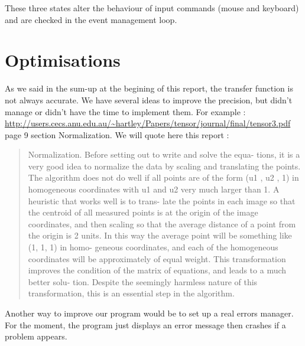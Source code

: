 \documentclass[a4paper,10pt]{report}
\begin{document}
These three states alter the behaviour of input commands (mouse and keyboard) and are checked in the event management loop.


\section{Optimisations}

As we said in the sum-up at the begining of this report, the transfer function is not always accurate.
We have several ideas to improve the precision, but didn't manage or didn't have the time to implement them. For example : \url{http://users.cecs.anu.edu.au/~hartley/Papers/tensor/journal/final/tensor3.pdf} page 9 section Normalization.
We will quote here this report :
\begin{quotation}
  Normalization. Before setting out to write and solve the equa-
  tions, it is a very good idea to normalize the data by scaling and
  translating the points. The algorithm does not do well if all points
  are of the form (u1 , u2 , 1) in homogeneous coordinates with u1 and
  u2 very much larger than 1. A heuristic that works well is to trans-
  late the points in each image so that the centroid of all measured
  points is at the origin of the image coordinates, and then scaling so
  that the average distance of a point from the origin is 2 units. In
  this way the average point will be something like (1, 1, 1) in homo-
  geneous coordinates, and each of the homogeneous coordinates will
  be approximately of equal weight. This transformation improves the
  condition of the matrix of equations, and leads to a much better solu-
  tion. Despite the seemingly harmless nature of this transformation,
  this is an essential step in the algorithm.
\end{quotation}

Another way to improve our program would be to set up a real errors manager. For the moment, the program just
displays an error message then crashes if a problem appears.
\end{document}

